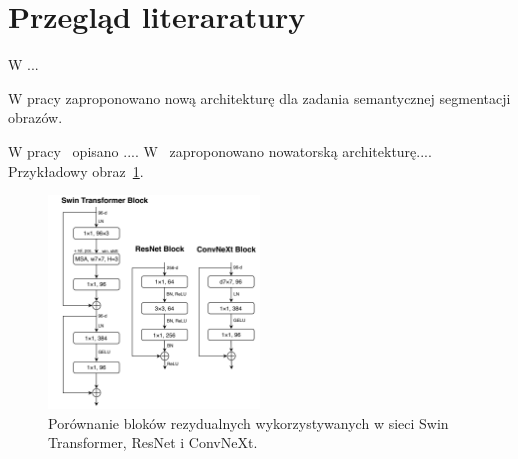 \newpage %
\section{Przegląd literaratury}

W \cite{vggnet} ...

W pracy \cite{unet} zaproponowano nową architekturę dla zadania semantycznej segmentacji obrazów. 


W pracy~\cite{he2016deep} opisano ....
W~\cite{liu2022convnet} zaproponowano nowatorską architekturę....
Przykładowy obraz~\ref{fig:convnext}.

\begin{figure}[h]
    \centering
    \includegraphics[width=0.5\textwidth]{rysunki/convnext_block.png}
    \caption{Porównanie bloków rezydualnych wykorzystywanych w sieci Swin Transformer, ResNet i ConvNeXt.}
    \label{fig:convnext}
\end{figure}
